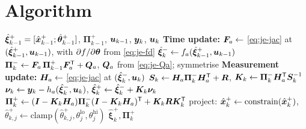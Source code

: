 \section{Algorithm}
\begin{algorithm}[H]
\caption{Joint EKF --- one sampling period}
\begin{algorithmic}[1]
\Require $\hat{\bm{\xi}}^+_{k-1}=[\xplus_{k-1};\hat{\vtheta}^+_{k-1}]$, $\bm{\Pi}^+_{k-1}$, $\vu_{k-1}$, $\vy_k$, $\vu_k$
\State \textbf{Time update:} $\mF_a\gets$ \eqref{eq:je-jac} at $(\hat{\bm{\xi}}^+_{k-1},\vu_{k-1})$, with $\partial f/\partial\vtheta$ from \eqref{eq:je-fd}
\State $\hat{\bm{\xi}}^-_k \gets f_a(\hat{\bm{\xi}}^+_{k-1},\vu_{k-1})$ 
\State $\bm{\Pi}^-_k \gets \mF_a\,\bm{\Pi}^+_{k-1}\mF_a^\T + \mQ_a$, \quad $\mQ_a$ from \eqref{eq:je-Qa}; symmetrise
\State \textbf{Measurement update:} $\mH_a\gets$ \eqref{eq:je-jac} at $(\hat{\bm{\xi}}^-_k,\vu_k)$
\State $\mS_k \gets \mH_a\bm{\Pi}^-_k\mH_a^\T+\mR$, \quad $\mK_k\gets\bm{\Pi}^-_k\mH_a^\T\mS_k\inv$
\State $\bm{\nu}_k\gets \vy_k-h_a(\hat{\bm{\xi}}^-_k,\vu_k)$, \quad $\hat{\bm{\xi}}^+_k\gets\hat{\bm{\xi}}^-_k+\mK_k\bm{\nu}_k$
\State $\bm{\Pi}^+_k\gets(\mI-\mK_k\mH_a)\bm{\Pi}^-_k(\mI-\mK_k\mH_a)^\T+\mK_k\mR\mK_k^\T$ 
\State project: $\xplus_k\gets\mathrm{constrain}(\xplus_k)$, \quad $\hat{\theta}^+_{k,j}\gets\mathrm{clamp}(\hat{\theta}^+_{k,j},\theta_{j}^{\mathrm{lo}},\theta_{j}^{\mathrm{hi}})$
\Ensure $\hat{\bm{\xi}}^+_k, \bm{\Pi}^+_k$
\end{algorithmic}
\end{algorithm}

